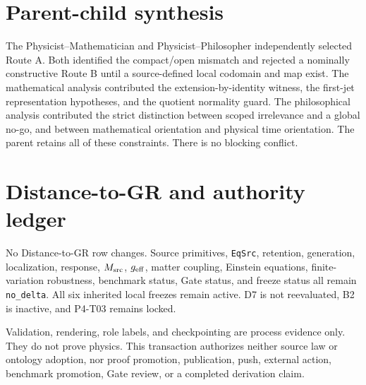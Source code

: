 \documentclass[11pt]{article}
\begin{document}
\section{Parent-child synthesis}

The Physicist--Mathematician and Physicist--Philosopher independently selected
Route A.  Both identified the compact/open mismatch and rejected a nominally
constructive Route B until a source-defined local codomain and map exist.  The
mathematical analysis contributed the extension-by-identity witness, the
first-jet representation hypotheses, and the quotient normality guard.  The
philosophical analysis contributed the strict distinction between scoped
irrelevance and a global no-go, and between mathematical orientation and
physical time orientation.  The parent retains all of these constraints.
There is no blocking conflict.

\section{Distance-to-GR and authority ledger}

No Distance-to-GR row changes.  Source primitives, \texttt{EqSrc}, retention,
generation, localization, response, \(M_{\rm src}\), \(g_{\rm eff}\), matter
coupling, Einstein equations, finite-variation robustness, benchmark status,
Gate status, and freeze status all remain \texttt{no\_delta}.  All six
inherited local freezes remain active.  D7 is not reevaluated, B2 is inactive,
and P4-T03 remains locked.

Validation, rendering, role labels, and checkpointing are process evidence
only.  They do not prove physics.  This transaction authorizes neither source
law or ontology adoption, nor proof promotion, publication, push, external
action, benchmark promotion, Gate review, or a completed derivation claim.
\end{document}
